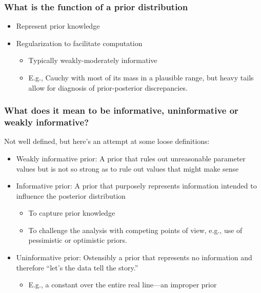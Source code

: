 \documentclass{beamer}
\begin{document}
\begin{frame}
  \frametitle{What is the function of a prior distribution}

  \begin{itemize}
  \item<1-> Represent prior knowledge
\item<2-> Regularization to facilitate computation
  \begin{itemize}
 \item Typically weakly-moderately informative
\item E.g., Cauchy with most of its mass in a plausible range, but heavy tails allow for diagnosis of prior-posterior discrepancies.
  \end{itemize}
  \end{itemize}

\end{frame}

\begin{frame}
  \frametitle{What does it mean to be informative, uninformative or
    weakly informative?}
  
Not well defined, but here's an attempt at some loose definitions:
  \begin{itemize}
  \item<1-> Weakly informative prior: A prior that rules out unreasonable
    parameter values but is not so strong as to rule out values that
    might make sense
\item<2-> Informative prior: A prior that purposely represents
  information intended to influence the  posterior distribution
  \begin{itemize}
  \item To capture prior knowledge
\item To challenge the analysis with competing points of view, e.g.,
  use of pessimistic or optimistic priors.
  \end{itemize}
\item<3-> Uninformative prior: Ostensibly a prior that represents no
  information and therefore ``let's the data tell the story.''
  \begin{itemize}
  \item E.g., a constant over the entire real line---an improper prior
  \end{itemize}
  \end{itemize}

\end{frame}
\end{document}
